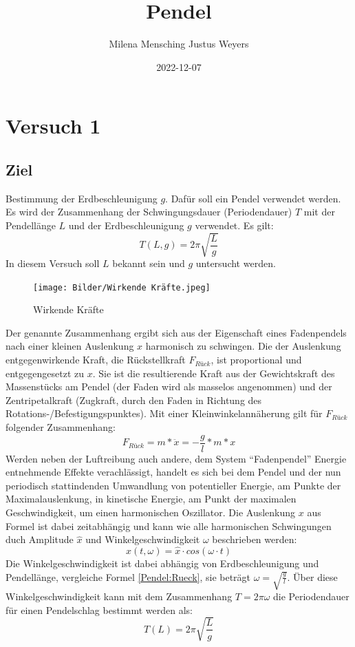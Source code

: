 \documentclass[
  9pt,
]{article}
\title{Pendel}
\author{Milena Mensching Justus Weyers}
\date{2022-12-07}
\begin{document}
\maketitle

\hypertarget{versuch-1}{%
\section{Versuch 1}\label{versuch-1}}

\hypertarget{ziel}{%
\subsection{Ziel}\label{ziel}}

Bestimmung der Erdbeschleunigung \(g\). Dafür soll ein Pendel verwendet
werden. Es wird der Zusammenhang der Schwingungsdauer (Periodendauer)
\(T\) mit der Pendellänge \(L\) und der Erdbeschleunigung \(g\)
verwendet. Es gilt: \[T(L,g) = 2\pi \sqrt{\frac{L}{g}}\] In diesem
Versuch soll \(L\) bekannt sein und \(g\) untersucht werden.

\begin{figure}
\centering
\texttt{[image: Bilder/Wirkende Kräfte.jpeg]}
\caption{Wirkende Kräfte}
\end{figure}

Der genannte Zusammenhang ergibt sich aus der Eigenschaft eines
Fadenpendels nach einer kleinen Auslenkung \(x\) harmonisch zu
schwingen. Die der Auslenkung entgegenwirkende Kraft, die Rückstellkraft
\(F_{Rück}\), ist proportional und entgegengesetzt zu \(x\). Sie ist die
resultierende Kraft aus der Gewichtskraft des Massenstücks am Pendel
(der Faden wird als masselos angenommen) und der Zentripetalkraft
(Zugkraft, durch den Faden in Richtung des
Rotations-/Befestigungspunktes). Mit einer Kleinwinkelannäherung gilt
für \(F_{Rück}\) folgender Zusammenhang:
\begin{equation}\label{Pendel:Rueck}
F_{Rück} = m * \ddot{x} = -\frac{g}{l}*m*x
\end{equation} Werden neben der Luftreibung auch andere, dem System
``Fadenpendel'' Energie entnehmende Effekte verachlässigt, handelt es
sich bei dem Pendel und der nun periodisch stattindenden Umwandlung von
potentieller Energie, am Punkte der Maximalauslenkung, in kinetische
Energie, am Punkt der maximalen Geschwindigkeit, um einen harmonischen
Oszillator. Die Auslenkung \(x\) aus Formel \label{Pendel:Ruek} ist
dabei zeitabhängig und kann wie alle harmonischen Schwingungen duch
Amplitude \(\hat{x}\) und Winkelgeschwindigkeit \(\omega\) beschrieben
werden: \begin{equation}\label{Pendel:Schwingung}
  x(t,\omega) = \hat{x} \cdot cos(\omega \cdot t)
\end{equation} Die Winkelgeschwindigkeit ist dabei abhängig von
Erdbeschleunigung und Pendellänge, vergleiche Formel \ref{Pendel:Rueck},
sie beträgt \(\omega=\sqrt{\frac{g}{l}}\). Über diese
Winkelgeschwindigkeit kann mit dem Zusammenhang \(T=2\pi\omega\) die
Periodendauer für einen Pendelschlag bestimmt werden als:
\begin{equation}\label{Pendel:Periodendauer}
T(L) = 2\pi \sqrt{\frac{L}{g}}
\end{equation}
\end{document}
